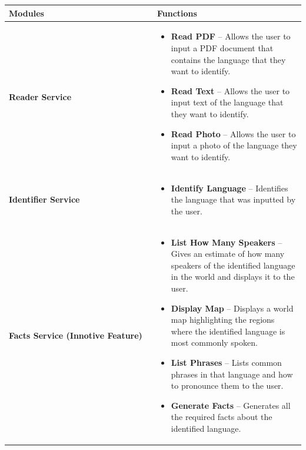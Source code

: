 \begin{longtable}{p{0.5\linewidth} | p{0.5\linewidth}}
\toprule
\textbf{Modules} & \textbf{Functions} \\
\midrule
\endhead

\textbf{Reader Service} & 
\begin{itemize}
    \item \textbf{Read PDF} – Allows the user to input a PDF document that contains the language that they want to identify.
    \item \textbf{Read Text} – Allows the user to input text of the language that they want to identify.
    \item \textbf{Read Photo} – Allows the user to input a photo of the language they want to identify.
\end{itemize} \\

\hline

\textbf{Identifier Service} & 
\begin{itemize}
    \item \textbf{Identify Language} – Identifies the language that was inputted by the user.
\end{itemize} \\


\hline

\textbf{Facts Service (Innotive Feature)} & 
\begin{itemize}
    \item \textbf{List How Many Speakers} – Gives an estimate of how many speakers of the identified language in the world and displays it to the user.
    \item \textbf{Display Map} – Displays a world map highlighting the regions where the identified language is most commonly spoken.
    \item \textbf{List Phrases} – Lists common phrases in that language and how to pronounce them to the user.
    \item \textbf{Generate Facts} – Generates all the required facts about the identified language.
\end{itemize} \\
\bottomrule
\end{longtable}



